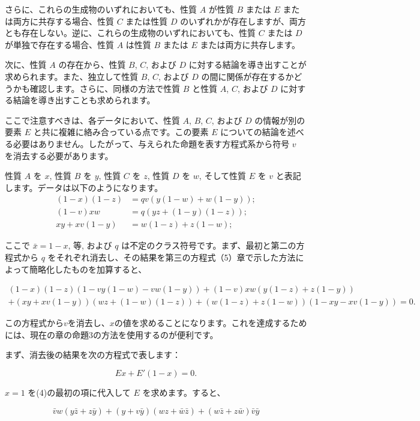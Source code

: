 \documentclass[a4paper,11pt,openany]{ltjsbook}
\begin{document}
さらに、これらの生成物のいずれにおいても、性質 $A$ が性質 $B$ または $E$ または両方に共存する場合、性質 $C$ または性質 $D$ のいずれかが存在しますが、両方とも存在しない。逆に、これらの生成物のいずれにおいても、性質 $C$ または $D$ が単独で存在する場合、性質 $A$ は性質 $B$ または $E$ または両方に共存します。

次に、性質 $A$ の存在から、性質 $B$, $C$, および $D$ に対する結論を導き出すことが求められます。また、独立して性質 $B$, $C$, および $D$ の間に関係が存在するかどうかも確認します。さらに、同様の方法で性質 $B$ と性質 $A$, $C$, および $D$ に対する結論を導き出すことも求められます。

ここで注意すべきは、各データにおいて、性質 $A$, $B$, $C$, および $D$ の情報が別の要素 $E$ と共に複雑に絡み合っている点です。この要素 $E$ についての結論を述べる必要はありません。したがって、与えられた命題を表す方程式系から符号 $v$ を消去する必要があります。

性質 $A$ を $x$, 性質 $B$ を $y$, 性質 $C$ を $z$, 性質 $D$ を $w$, そして性質 $E$ を $v$ と表記します。データは以下のようになります。
\begin{align}
(1 - x)(1 - z) &= q v (y (1 - w) + w (1 - y));\\
(1 - v) x w &= q (yz + (1 - y)(1 - z));\\
xy + xv (1 - y) &= w (1 - z) + z (1 - w);
\end{align}

ここで $\bar{x} = 1 - x$, 等, および $q$ は不定のクラス符号です。まず、最初と第二の方程式から $q$ をそれぞれ消去し、その結果を第三の方程式（5）章で示した方法によって簡略化したものを加算すると、

\begin{align}
(1 - x)(1 - z) (1 - v y (1 - w) - v w (1 - y)) + (1 - v) x w (y (1 - z) + z (1 - y)) \\
+ (xy + xv (1 - y)) (wz + (1 - w)(1 - z)) + (w (1 - z) + z (1 - w)) (1 - xy - xv (1 - y)) = 0.
\end{align}

この方程式から$v$を消去し、$x$の値を求めることになります。これを達成するためには、現在の章の命題3の方法を使用するのが便利です。

まず、消去後の結果を次の方程式で表します：

\[
Ex + E' (1-x) = 0.
\]

$x = 1$ を(4)の最初の項に代入して $E$ を求めます。すると、

\[
\bar{v}w(y\bar{z} + z\bar{y}) + (y + v\bar{y})(wz + \bar{w}\bar{z}) + (w\bar{z} + z\bar{w})\bar{v}\bar{y}
\]
\end{document}
